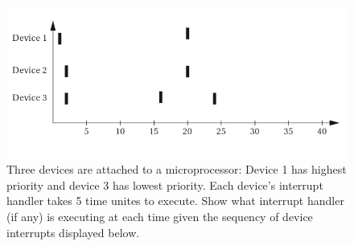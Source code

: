 \documentclass{article}
\begin{document}
\begin{figure}[h]
	\centering
	\caption{Three devices are attached to a microprocessor: Device 1 has highest priority and device 3 has lowest priority. Each device's interrupt handler takes 5 time unites to execute. Show what interrupt handler (if any) is executing at each time given the sequency of device interrupts displayed below.}
	\includegraphics[width=\textwidth,keepaspectratio]{Q3-19}
\end{figure}


\label{end}
\end{document}
